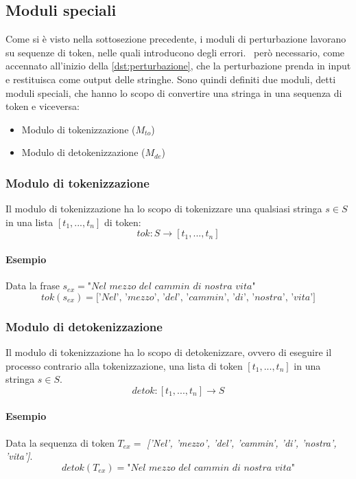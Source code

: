 \subsection{Moduli speciali}
\label{sec:dst_modspec}
Come si è visto nella sottosezione precedente, i moduli di perturbazione lavorano su sequenze di token, nelle quali introducono degli errori. \E\ però necessario, come accennato all'inizio della \autoref{dst:perturbazione}, che la perturbazione prenda in input e restituisca come output delle stringhe. Sono quindi definiti due moduli, detti moduli speciali, che hanno lo scopo di convertire una stringa in una sequenza di token e viceversa:
\newcommand{\mto}{$M_{to}$}
\newcommand{\mde}{$M_{de}$}
\begin{itemize}
\item Modulo di tokenizzazione (\mto)
\item Modulo di detokenizzazione (\mde)
\end{itemize}

\subsubsection{Modulo di tokenizzazione}
Il modulo di tokenizzazione ha lo scopo di tokenizzare una qualsiasi stringa $s \in S$ in una lista $[t_1,...,t_n]$ di token:
\begin{equation}
tok: S \rightarrow [t_1,...,t_n]
\end{equation}
\paragraph{Esempio}
Data la frase $s_{ex} = \textit{"Nel mezzo del cammin di nostra vita"}$  
\begin{equation}
tok(s_{ex}) = \textit{['Nel', 'mezzo', 'del', 'cammin', 'di', 'nostra', 'vita']}
\end{equation}

\subsubsection{Modulo di detokenizzazione}
Il modulo di tokenizzazione ha lo scopo di detokenizzare, ovvero di eseguire il processo contrario alla tokenizzazione, una lista di token $[t_1,...,t_n]$ in una stringa $s \in S$.
\begin{equation}
detok: [t_1,...,t_n] \rightarrow S
\end{equation}
\paragraph{Esempio}
Data la sequenza di token $T_{ex} =$ \textit{['Nel', 'mezzo', 'del', 'cammin', 'di', 'nostra', 'vita']}.
\begin{equation}
detok(T_{ex}) = \textit{"Nel mezzo del cammin di nostra vita"}
\end{equation}



